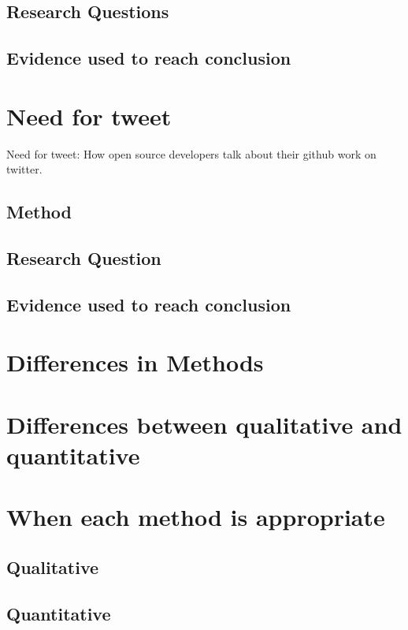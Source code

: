 \documentclass[conference]{IEEEtran}
\begin{document}
\subsection{Research Questions}

\subsection{Evidence used to reach conclusion}

\section{Need for tweet}

Need for tweet: How open source developers talk about their github work on twitter.~\cite{fang2020need}

\subsection{Method}

\subsection{Research Question}

\subsection{Evidence used to reach conclusion}

\section{Differences in Methods}

\section{Differences between qualitative and quantitative}

\section{When each method is appropriate}

\subsection{Qualitative}

\subsection{Quantitative}
\end{document}
